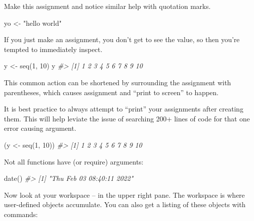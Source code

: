 \documentclass[
]{book}
\newenvironment{Shaded}{\begin{snugshade}}{\end{snugshade}}
\newcommand{\CommentTok}[1]{\textcolor[rgb]{0.56,0.35,0.01}{\textit{#1}}}
\newcommand{\DecValTok}[1]{\textcolor[rgb]{0.00,0.00,0.81}{#1}}
\newcommand{\FunctionTok}[1]{\textcolor[rgb]{0.00,0.00,0.00}{#1}}
\newcommand{\NormalTok}[1]{#1}
\newcommand{\OtherTok}[1]{\textcolor[rgb]{0.56,0.35,0.01}{#1}}
\newcommand{\StringTok}[1]{\textcolor[rgb]{0.31,0.60,0.02}{#1}}
\begin{document}
Make this assignment and notice similar help with quotation marks.

\begin{Shaded}
\begin{Highlighting}[]
\NormalTok{yo }\OtherTok{\textless{}{-}} \StringTok{"hello world"}
\end{Highlighting}
\end{Shaded}

If you just make an assignment, you don't get to see the value, so then you're tempted to immediately inspect.

\begin{Shaded}
\begin{Highlighting}[]
\NormalTok{y }\OtherTok{\textless{}{-}} \FunctionTok{seq}\NormalTok{(}\DecValTok{1}\NormalTok{, }\DecValTok{10}\NormalTok{)}
\NormalTok{y}
\CommentTok{\#\textgreater{}  [1]  1  2  3  4  5  6  7  8  9 10}
\end{Highlighting}
\end{Shaded}

This common action can be shortened by surrounding the assignment with parentheses, which causes assignment and ``print to screen'' to happen.

It is best practice to always attempt to ``print'' your assignments after creating them. This will help leviate the issue of searching 200+ lines of code for that one error causing argument.

\begin{Shaded}
\begin{Highlighting}[]
\NormalTok{(y }\OtherTok{\textless{}{-}} \FunctionTok{seq}\NormalTok{(}\DecValTok{1}\NormalTok{, }\DecValTok{10}\NormalTok{))}
\CommentTok{\#\textgreater{}  [1]  1  2  3  4  5  6  7  8  9 10}
\end{Highlighting}
\end{Shaded}

Not all functions have (or require) arguments:

\begin{Shaded}
\begin{Highlighting}[]
\FunctionTok{date}\NormalTok{()}
\CommentTok{\#\textgreater{} [1] "Thu Feb 03 08:40:11 2022"}
\end{Highlighting}
\end{Shaded}

Now look at your workspace -- in the upper right pane. The workspace is where user-defined objects accumulate. You can also get a listing of these objects with commands:
\end{document}

